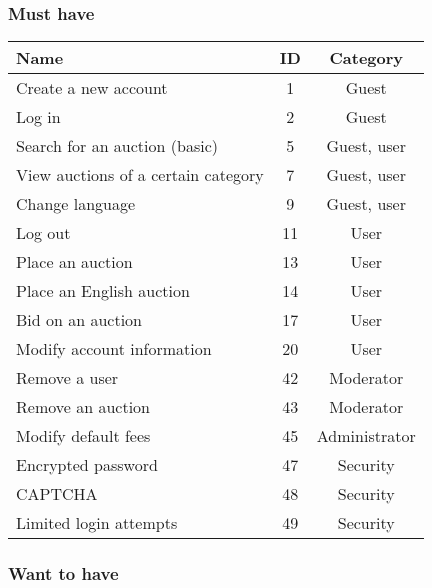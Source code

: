 	\subsubsection{Must have}
	
	\begin{tabular}{l|c c}
	  Name & ID & Category \\ 
	  \hline
	  Create a new account & 1 & Guest \\ 
	  Log in & 2 & Guest \\	  
	  Search for an auction (basic) & 5 & Guest, user \\
	  View auctions of a certain category & 7 & Guest, user \\
	  Change language & 9 & Guest, user \\
	  Log out & 11 & User \\
	  Place an auction & 13 & User \\
	  Place an English auction & 14 & User \\
	  Bid on an auction & 17 & User \\
	  Modify account information & 20 & User \\
	  Remove a user & 42 & Moderator \\
	  Remove an auction & 43 & Moderator \\
	  Modify default fees & 45 & Administrator \\
	  Encrypted password & 47 & Security \\
	  CAPTCHA & 48 & Security \\
	  Limited login attempts & 49 & Security  	  
	\end{tabular} 
	
	\subsubsection{Want to have}
	
